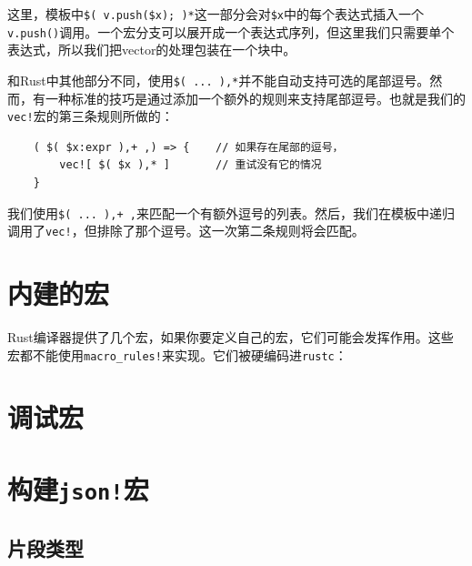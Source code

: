 这里，模板中\texttt{\$( v.push(\$x); )*}这一部分会对\texttt{\$x}中的每个表达式插入一个\texttt{v.push()}调用。一个宏分支可以展开成一个表达式序列，但这里我们只需要单个表达式，所以我们把vector的处理包装在一个块中。

和Rust中其他部分不同，使用\texttt{\$( ... ),*}并不能自动支持可选的尾部逗号。然而，有一种标准的技巧是通过添加一个额外的规则来支持尾部逗号。也就是我们的\texttt{vec!}宏的第三条规则所做的：
\begin{verbatim}
    ( $( $x:expr ),+ ,) => {    // 如果存在尾部的逗号，
        vec![ $( $x ),* ]       // 重试没有它的情况
    }
\end{verbatim}

我们使用\texttt{\$( ... ),+ ,}来匹配一个有额外逗号的列表。然后，我们在模板中递归调用了\texttt{vec!}，但排除了那个逗号。这一次第二条规则将会匹配。

\section{内建的宏}
Rust编译器提供了几个宏，如果你要定义自己的宏，它们可能会发挥作用。这些宏都不能使用\texttt{macro\_rules!}来实现。它们被硬编码进\texttt{rustc}：








\section{调试宏}\label{DebugMacro}


\section{构建\texttt{json!}宏}


\subsection{片段类型}\label{FragType}
